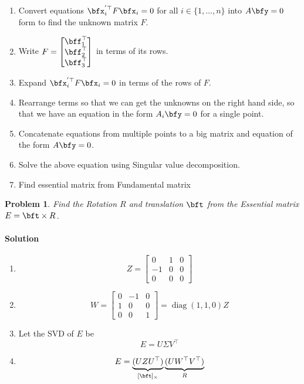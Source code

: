 \documentclass[times,singlecolumn]{article}
\newtheorem{prob}{Problem}
\DeclareMathOperator{\diag}{diag}
\begin{document}
\begin{enumerate}
  \item Convert equations $\bfx_i^{'\top} F \bfx_i = 0$ for all $i \in \{1, \dots,
    n\}$ into $A\bfy = 0$ form to find the unknown matrix $F$.
    \vspace{10em}
  \item Write $F = \begin{bmatrix} \bff_1^\top \\ \bff_2^\top \\ \bff_3^\top\end{bmatrix}$ in terms of its rows.
    \vspace{10em}
  \item Expand $\bfx_i^{'\top} F\bfx_i = 0$  in terms of the rows of $F$.
    \vspace{10em}
  \item Rearrange terms so that we can get the unknowns on the right hand side,
    so that we have an equation in the form $A_i \bfy = 0$ for a single point.
    \vspace{10em}
  \item Concatenate equations from multiple points to a big matrix and equation
    of the form $A \bfy = 0$.
    \vspace{10em}
  \item Solve the above equation using Singular value decomposition.
    \vspace{10em}
  \item Find essential matrix from Fundamental matrix
    \vspace{10em}

\end{enumerate}

\begin{prob}
  Find the Rotation $R$ and translation $\bft$ from the Essential matrix $E =
  \bft \times R$.
\end{prob}
\paragraph{Solution}
\begin{enumerate}
  
\item \[ Z = \begin{bmatrix} 0 & 1 & 0 \\ -1 & 0 & 0 \\ 0 & 0 & 0\end{bmatrix} \]
\item \[ W = \begin{bmatrix} 0 & -1 & 0 \\ 1 & 0 & 0 \\ 0 & 0 & 1\end{bmatrix}
    = \diag(1, 1, 0) Z \]
\item Let the SVD of $E$ be \[ E = U\Sigma V^\top \]
\item \[ E = \underbrace{(UZU^\top)}_{[\bft]_\times} \underbrace{(UW^\top V^\top)}_{R}  \]
\end{enumerate}
\end{document}
